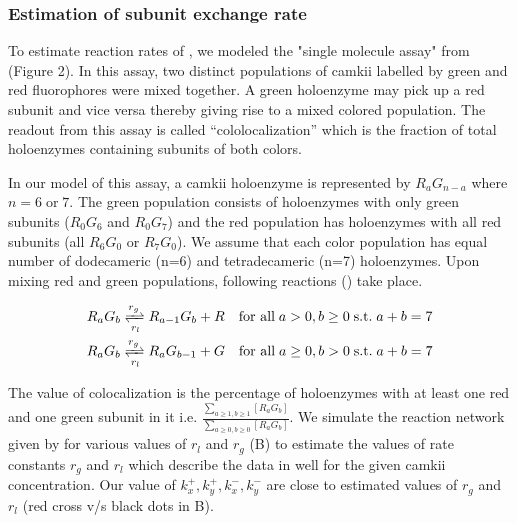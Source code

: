 \documentclass[9pt,lineno]{elife}
\begin{document}
{%
\subsubsection{Estimation of subunit exchange rate}\label{subsec:estimate_exchange_rate}

To estimate reaction rates of , we modeled the "single molecule
assay" from \cite{stratton_activation-triggered_2014} (Figure 2). In this assay,
two distinct populations of \gls{camkii} labelled by green and red fluorophores
were mixed together. A green holoenzyme may pick up a red subunit and vice versa
thereby giving rise to a mixed colored population. The readout from this assay
is called ``cololocalization'' which is the fraction of total holoenzymes
containing subunits of both colors.

In our model of this assay, a \gls{camkii} holoenzyme is represented by
$R_aG_{n-a}$ where $n=6\;\text{or}\;7$. The green population consists of
holoenzymes with only green subunits ($R_0G_6$ and $R_0G_7$) and the red
population has holoenzymes with all red subunits (all $R_6G_0$ or $R_7G_0$).  We
assume that each color population has equal number of dodecameric (n=6) and
tetradecameric (n=7) holoenzymes. Upon mixing red and green populations,
following reactions () take place.

\begin{equation}\label{eq:mixing_assay}
    \begin{gathered}
        R_aG_b \xrightleftharpoons[r_l]{r_g} R_{a-1}G_b + R 
        \quad \text{for all}\; a>0,b\ge 0\; \text{s.t.}\; a+b=7 \\
        R_aG_b \xrightleftharpoons[r_l]{r_g} R_{a}G_{b-1} + G 
        \quad \text{for all}\; a\ge 0,b> 0\; \text{s.t.}\; a+b=7
    \end{gathered}
\end{equation}

The value of colocalization is the percentage of holoenzymes with at least one
red and one green subunit in it i.e. $\frac{\sum_{a\ge 1, b \ge 1} [R_aG_b]}{
\sum_{a\ge0,b \ge 0}[R_aG_b]}$. We simulate the reaction network given by
 for various values of $r_l$ and $r_g$
(B) to estimate the values of rate constants
$r_g$ and $r_l$ which describe the data in
\cite{stratton_activation-triggered_2014} well for the given \gls{camkii}
concentration. Our value of $k_x^+, k_y^+, k_x^-, k_y^-$ are close to estimated
values of $r_g$ and $r_l$ (red cross v/s black dots in
B). 

}
\end{document}
